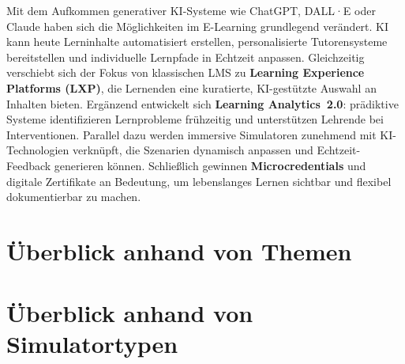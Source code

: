 Mit dem Aufkommen generativer KI-Systeme wie ChatGPT, DALL·E oder Claude haben sich die Möglichkeiten im E-Learning grundlegend verändert. KI kann heute Lerninhalte automatisiert erstellen, personalisierte Tutorensysteme bereitstellen und individuelle Lernpfade in Echtzeit anpassen.\parencite[S.~43]{zhai_chatgpt_2023} Gleichzeitig verschiebt sich der Fokus von klassischen LMS zu \textbf{Learning Experience Platforms (LXP)}, die Lernenden eine kuratierte, KI-gestützte Auswahl an Inhalten bieten.\parencite[S.~1]{cockrill_learning_2021} Ergänzend entwickelt sich \textbf{Learning Analytics~2.0}: prädiktive Systeme identifizieren Lernprobleme frühzeitig und unterstützen Lehrende bei Interventionen.\parencite[S.~1979f]{ifenthaler_utilising_2020} Parallel dazu werden immersive Simulatoren zunehmend mit KI-Technologien verknüpft, die Szenarien dynamisch anpassen und Echtzeit-Feedback generieren können. Schließlich gewinnen \textbf{Microcredentials} und digitale Zertifikate an Bedeutung, um lebenslanges Lernen sichtbar und flexibel dokumentierbar zu machen.\parencite[S.~1]{gish-lieberman_micro-credentials_2021}


\section{Überblick anhand von Themen}\label{chap_4_2}

\section{Überblick anhand von Simulatortypen}
